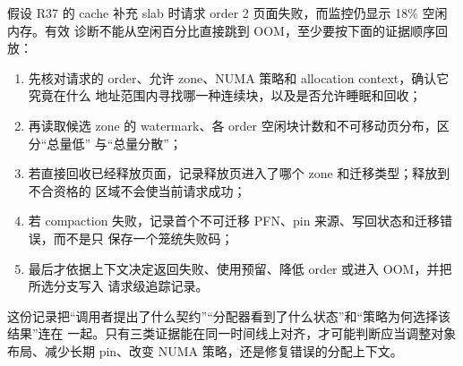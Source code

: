 假设 R37 的 cache 补充 slab 时请求 order 2 页面失败，而监控仍显示 18\% 空闲内存。有效
诊断不能从空闲百分比直接跳到 OOM，至少要按下面的证据顺序回放：

\begin{enumerate}
\tightlist
\item 先核对请求的 order、允许 zone、NUMA 策略和 allocation context，确认它究竟在什么
      地址范围内寻找哪一种连续块，以及是否允许睡眠和回收；
\item 再读取候选 zone 的 watermark、各 order 空闲块计数和不可移动页分布，区分“总量低”
      与“总量分散”；
\item 若直接回收已经释放页面，记录释放页进入了哪个 zone 和迁移类型；释放到不合资格的
      区域不会使当前请求成功；
\item 若 compaction 失败，记录首个不可迁移 PFN、pin 来源、写回状态和迁移错误，而不是只
      保存一个笼统失败码；
\item 最后才依据上下文决定返回失败、使用预留、降低 order 或进入 OOM，并把所选分支写入
      请求级追踪记录。
\end{enumerate}

这份记录把“调用者提出了什么契约”“分配器看到了什么状态”和“策略为何选择该结果”连在
一起。只有三类证据能在同一时间线上对齐，才可能判断应当调整对象布局、减少长期 pin、改变
NUMA 策略，还是修复错误的分配上下文。
